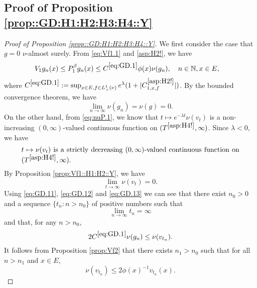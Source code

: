 \documentclass[12pt,a4paper]{amsart}
\numberwithin{equation}{section}
\theoremstyle{plain}
\theoremstyle{definition}
\theoremstyle{remark}
\begin{document}
\subsection{Proof of Proposition \ref{prop::GD:H1:H2:H3:H4::Y}}
\begin{proof}[Proof of Proposition \ref{prop::GD:H1:H2:H3:H4::Y}] \label{sec:GD}
	We first consider the case that $g = 0$ $\nu$-almost surely.
	From \eqref{eq:Vf1.1} and \eqref{asp:H2!}, we have
\begin{align}\label{eq:GD.1}
	&V_1 g_n(x)
	\leq P^\beta_1 g_n(x)
	\leq C^{\eqref{eq:GD.1}} \phi(x) \nu(g_n),
	\quad n \in \mathbb N, x\in E,
\end{align}
	where $C^{\eqref{eq:GD.1}}:= \sup_{x\in E, f\in L_+^1(\nu)}e^{\lambda }(1+|C^{\eqref{asp:H2!}}_{1,x,f}|)$.
	By the bounded convergence theorem, we have
\begin{equation} \label{eq:GD.11}
	\lim_{n\to \infty} \nu(g_n) = \nu(g) = 0.
\end{equation}
	On the other hand, from \eqref{eq:nuP.1}, we know that $ t\mapsto e^{-\lambda t}\nu(v_t)$ is a non-increasing $(0,\infty)$-valued continuous function on $(T^{\eqref{asp:H4!}},\infty)$.
	Since $\lambda <0$, we have
\begin{equation} \label{eq:GD.12}
\begin{minipage}{0.9\textwidth}
	$ t\mapsto \nu(v_t)$ is a strictly decreasing $(0,\infty)$-valued continuous function on $(T^{\eqref{asp:H4!}},\infty)$.
\end{minipage}
\end{equation}
	By Proposition \ref{prop:Vf1::H1:H2::Y}, we have
\begin{equation} \label{eq:GD.13}
	\lim_{t\to \infty}\nu(v_t) =0.
\end{equation}
	Using \eqref{eq:GD.11}, \eqref{eq:GD.12} and \eqref{eq:GD.13} we can see that there exist $n_0>0$ and a sequence $\{t_n: n>n_0\}$ of positive numbers such that
\begin{equation} \label{eq:GD.14}
	\lim_{n\to \infty} t_n = \infty
\end{equation}
	and that, for any $n>n_0$,
\begin{equation} \label{eq:GD.2} 
	2C^{\eqref{eq:GD.1}} \nu(g_n) 
	\leq \nu(v_{t_n}). 
\end{equation}
	It follows from Proposition \ref{prop:Vf2} that there exists $n_1 > n_0$ such that for all $n>n_1$ and $x\in E$,
\begin{equation} \label{eq:GD.25}
	\nu(v_{t_n})\leq 2\phi(x)^{-1} v_{t_n}(x).
\end{equation}

\end{proof}
\end{document}
